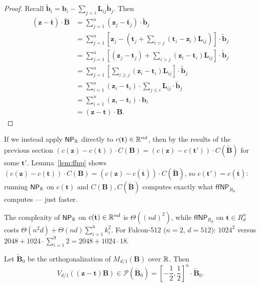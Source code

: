 \begin{proof}
	Recall $\tilde{\mathbf{b}}_i = \mathbf{b}_i - \sum_{j<i} \mathbf{L}_{ij} \tilde{\mathbf{b}}_j$. Then
	\begin{align*}
		(\mathbf{z} - \overline{\mathbf{t}}) \cdot \tilde{\mathbf{B}}
		&= \sum_{j=1}^n (\mathbf{z}_j - \overline{\mathbf{t}}_j) \cdot \tilde{\mathbf{b}}_j \\
		&= \sum_{j=1}^n \left[ \mathbf{z}_j - \left( \mathbf{t}_j + \sum_{i>j} (\mathbf{t}_i - \mathbf{z}_i) \mathbf{L}_{ij} \right) \right] \cdot \tilde{\mathbf{b}}_j \\
		&= \sum_{j=1}^n \left[ (\mathbf{z}_j - \mathbf{t}_j) + \sum_{i>j} (\mathbf{z}_i - \mathbf{t}_i) \mathbf{L}_{ij} \right] \cdot \tilde{\mathbf{b}}_j \\
		&= \sum_{j=1}^n \left[ \sum_{i \geq j} (\mathbf{z}_i - \mathbf{t}_i) \mathbf{L}_{ij} \right] \cdot \tilde{\mathbf{b}}_j \\
		&= \sum_{i=1}^n (\mathbf{z}_i - \mathbf{t}_i) \cdot \sum_{j \leq i} \mathbf{L}_{ij} \cdot \tilde{\mathbf{b}}_j \\
		&= \sum_{i=1}^n (\mathbf{z}_i - \mathbf{t}_i) \cdot \mathbf{b}_i \\
		&= (\mathbf{z} - \mathbf{t}) \cdot \mathbf{B}.
	\end{align*}
\end{proof}

\begin{remark}
	If we instead apply $\mathsf{NP}_{\mathbb{R}}$ directly to $c(\mathbf{t}) \in \mathbb{R}^{nd}$, then by the results of the previous section $(c(\mathbf{z}) - c(\mathbf{t})) \cdot C(\mathbf{B}) = (c(\mathbf{z}) - c(\mathbf{t}')) \cdot C(\tilde{\mathbf{B}})$ for some $\mathbf{t}'$. Lemma~\ref{lem:ffnp} shows $(c(\mathbf{z}) - c(\mathbf{t})) \cdot C(\mathbf{B}) = (c(\mathbf{z}) - c(\overline{\mathbf{t}})) \cdot C(\tilde{\mathbf{B}})$, so $c(\mathbf{t}') = c(\overline{\mathbf{t}})$: running $\mathsf{NP}_{\mathbb{R}}$ on $c(\mathbf{t})$ and $C(\mathbf{B}), C(\tilde{\mathbf{B}})$ computes exactly what $\mathsf{ffNP}_{R_d}$ computes — just faster.

	The complexity of $\mathsf{NP}_{\mathbb{R}}$ on $c(\mathbf{t}) \in \mathbb{R}^{nd}$ is $\Theta((nd)^2)$, while $\mathsf{ffNP}_{R_d}$ on $\mathbf{t} \in R_d^n$ costs $\Theta(n^2 d) + \Theta(nd) \sum_{i=1}^h k_i^2$. For Falcon-512 ($n=2$, $d=512$): $1024^2$ versus $2048 + 1024 \cdot \sum_{i=1}^9 2 = 2048 + 1024 \cdot 18$.
\end{remark}

\begin{theorem}
	\label{thm:ffnp-guarantee}
	Let $\tilde{\mathbf{B}}_0$ be the orthogonalization of $M_{d/1}(\mathbf{B})$ over $\mathbb{R}$. Then
	\[
		V_{d/1}((\mathbf{z} - \mathbf{t})\mathbf{B}) \in \mathcal{P}(\tilde{\mathbf{B}}_0) = \left[-\frac{1}{2}, \frac{1}{2}\right]^n \cdot \tilde{\mathbf{B}}_0.
	\]
\end{theorem}

